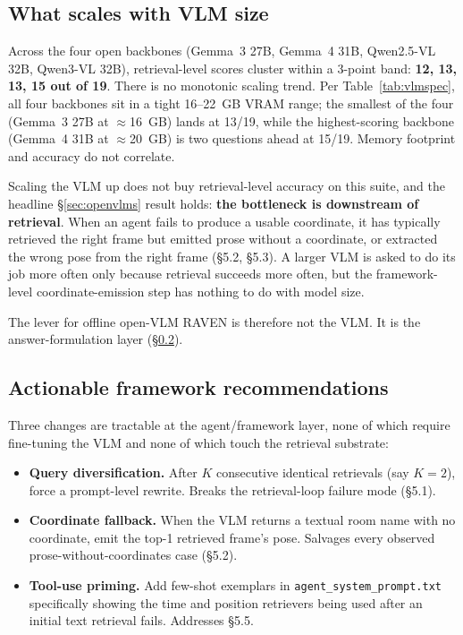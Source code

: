 \documentclass[12pt,letterpaper,oneside]{article}
\begin{document}
\subsection{What scales with VLM size}

Across the four open backbones (Gemma~3 27B, Gemma~4 31B,
Qwen2.5-VL 32B, Qwen3-VL 32B), retrieval-level scores cluster within
a 3-point band: \textbf{12, 13, 13, 15 out of 19}.  There is no
monotonic scaling trend.  Per Table~\ref{tab:vlmspec}, all four
backbones sit in a tight 16--22~GB VRAM range; the smallest of the
four (Gemma~3 27B at $\approx$16~GB) lands at 13/19, while the
highest-scoring backbone (Gemma~4 31B at $\approx$20~GB) is two
questions ahead at 15/19.  Memory footprint and accuracy do not
correlate.

Scaling the VLM up does not buy retrieval-level accuracy on this
suite, and the headline \S\ref{sec:openvlms} result holds: \textbf{the
bottleneck is downstream of retrieval}.  When an agent fails to
produce a usable coordinate, it has typically retrieved the right
frame but emitted prose without a coordinate, or extracted the wrong
pose from the right frame (\S5.2, \S5.3).  A larger VLM is asked to
do its job more often only because retrieval succeeds more often, but
the framework-level coordinate-emission step has nothing to do with
model size.

The lever for offline open-VLM RAVEN is therefore not the VLM. It is
the answer-formulation layer (\S\ref{sec:recs}).

\subsection{Actionable framework recommendations}\label{sec:recs}

Three changes are tractable at the agent/framework layer, none of
which require fine-tuning the VLM and none of which touch the
retrieval substrate:

\begin{itemize}
  \item \textbf{Query diversification.}  After $K$ consecutive
    identical retrievals (say $K = 2$), force a prompt-level rewrite.
    Breaks the retrieval-loop failure mode (\S5.1).
  \item \textbf{Coordinate fallback.}  When the VLM returns a textual
    room name with no coordinate, emit the top-1 retrieved frame's
    pose. Salvages every observed prose-without-coordinates case
    (\S5.2).
  \item \textbf{Tool-use priming.}  Add few-shot exemplars in
    \texttt{agent\_system\_prompt.txt} specifically showing the time
    and position retrievers being used after an initial text
    retrieval fails.  Addresses \S5.5.
\end{itemize}
\end{document}

